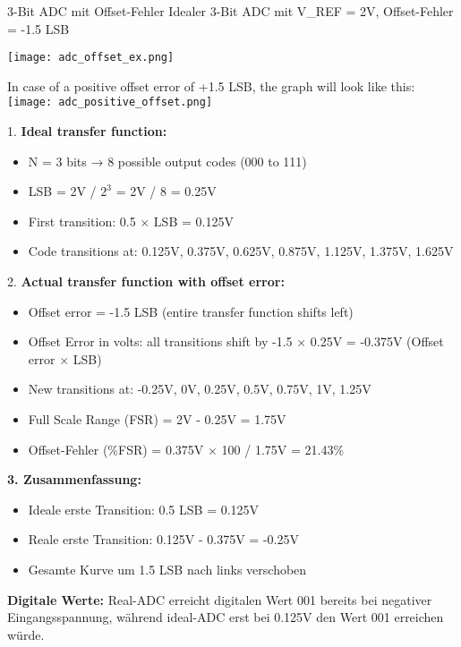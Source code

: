 \begin{example2}{3-Bit ADC mit Offset-Fehler}
    Idealer 3-Bit ADC mit V\_REF = 2V, Offset-Fehler = -1.5 LSB
    
    \tcblower

    \begin{minipage}{0.5\linewidth}
    \texttt{[image: adc\_offset\_ex.png]}
    \end{minipage}
    \begin{minipage}{0.5\linewidth}
        In case of a positive offset error of +1.5 LSB, the graph will look like this:\\
        \texttt{[image: adc\_positive\_offset.png]}
    \end{minipage}

    1. \textbf{Ideal transfer function:}
    \begin{itemize}
        \item N = 3 bits → 8 possible output codes (000 to 111)
        \item LSB = 2V / $2^3$ = 2V / 8 = 0.25V
        \item First transition: 0.5 × LSB = 0.125V
        \item Code transitions at: 0.125V, 0.375V, 0.625V, 0.875V, 1.125V, 1.375V, 1.625V
    \end{itemize}

    2. \textbf{Actual transfer function with offset error:}
    \begin{itemize}
        \item Offset error = -1.5 LSB (entire transfer function shifts left)
        \item Offset Error in volts: all transitions shift by -1.5 × 0.25V = -0.375V (Offset error $\times$ LSB)
        \item New transitions at: -0.25V, 0V, 0.25V, 0.5V, 0.75V, 1V, 1.25V
        \item Full Scale Range (FSR) = 2V - 0.25V = 1.75V
        \item Offset-Fehler (\%FSR) = 0.375V $\times$ 100 / 1.75V = 21.43\%
    \end{itemize}

    
    \textbf{3. Zusammenfassung:}
    \begin{itemize}
        \item Ideale erste Transition: 0.5 LSB = 0.125V
        \item Reale erste Transition: 0.125V - 0.375V = -0.25V
        \item Gesamte Kurve um 1.5 LSB nach links verschoben
    \end{itemize}
    
    \textbf{Digitale Werte:}
    Real-ADC erreicht digitalen Wert 001 bereits bei negativer Eingangsspannung, während ideal-ADC erst bei 0.125V den Wert 001 erreichen würde.
\end{example2}




